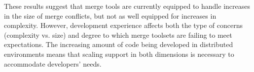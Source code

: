 These results suggest that merge tools are currently equipped to handle increases in the size of merge conflicts, but not as well equipped for increases in complexity.
However, development experience affects both the type of concerns (complexity vs. size) and degree to which merge toolsets are failing to meet expectations.
The increasing amount of code being developed in distributed environments means that scaling support in both dimensions is necessary to accommodate developers' needs.